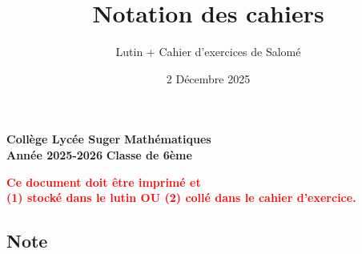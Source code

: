 \documentclass[answers]{exam}
\title{Notation des cahiers}
\author{Lutin + Cahier d'exercices de Salomé}
\date{2 Décembre 2025}
\begin{document}
\textbf{Collège Lycée Suger}
\hfill
\textbf{Mathématiques} \\

\textbf{Année 2025-2026}
\hfill
\textbf{Classe de 6ème} \par

{\let\newpage\relax\maketitle}

\begin{tcolorbox}[
  colframe=red!90!black,
  fonttitle=\bfseries,
  boxsep=4pt,
  sharp corners,
]
\begin{center}
\textbf{\textcolor{red}{Ce document doit être imprimé et \\ (1) stocké dans le lutin OU (2) collé dans le cahier d'exercice.}}
\end{center}
\end{tcolorbox}

\subsection*{Note}
\end{document}
